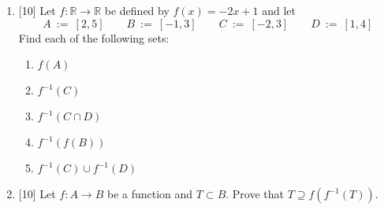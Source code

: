\documentclass[12pt]{article}
\newcommand{\RR}{{\mathbb R}}
\begin{document}
\begin{enumerate}
\item{[10]} Let $f\colon \RR\to \RR$ be defined by $f(x)=-2x+1$ and let
  \[
  A \ :=\ [2,5] \qquad
  B \ :=\ [-1,3] \qquad
  C \ :=\ [-2,3] \qquad
  D \ :=\ [1,4] 
  \]  
  Find each of the following sets:
 \begin{enumerate}
  \item $f(A)$
  \item $f^{-1}(C)$
  \item $f^{-1}(C\cap D)$
  \item $f^{-1}(f(B))$
  \item $f^{-1}(C)\cup f^{-1}(D)$
 \end{enumerate}  

\item{[10]}  Let $f\colon A\to B$ be a function and $T\subset B$.
           Prove that $T\supseteq f(f^{-1}(T))$.  

\end{enumerate}
\end{document}
